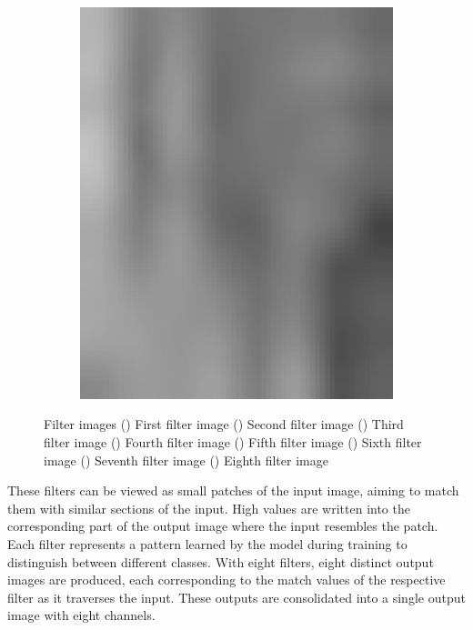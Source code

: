 \begin{figure}[h!]
\begin{subfigure}{0.22\textwidth}
		\includegraphics[width=\linewidth]{Images/KDDProcess/eighthFilter}
		\caption{}    %
		\label{subfig:eighthFilter}
	\end{subfigure}
	
	\caption{Filter images \cite{Li:2021} () First filter image  () Second filter image () Third filter image () Fourth filter image () Fifth filter image () Sixth filter image  () Seventh filter image () Eighth filter image}
	\label{fig:filterImages}
\end{figure}

These filters can be viewed as small patches of the input image, aiming to match them with similar sections of the input. High values are written into the corresponding part of the output image where the input resembles the patch. Each filter represents a pattern learned by the model during training to distinguish between different classes. With eight filters, eight distinct output images are produced, each corresponding to the match values of the respective filter as it traverses the input. These outputs are consolidated into a single output image with eight channels.

